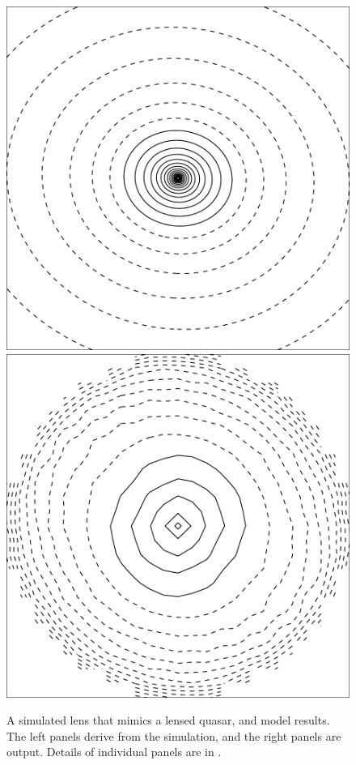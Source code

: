 \begin{figure}
  \includegraphics[width=\myplotswidth]{fig/ASW000102p_006941_kappa}
  \includegraphics[width=\myplotswidth]{fig/006941_mass}
  \caption[result 6941 (ASW000102p)]{A simulated lens that mimics a
    lensed quasar, and model results.  The left panels derive from the
    simulation, and the right panels are \spl output.  Details of
    individual panels are in .}

  \label{fig:6941}
\end{figure}

